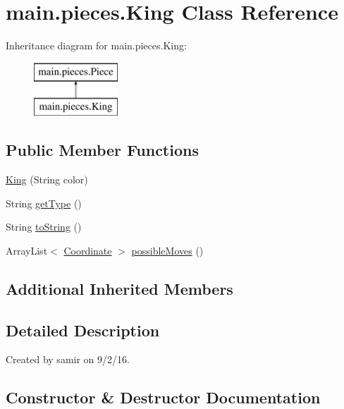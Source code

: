 \hypertarget{classmain_1_1pieces_1_1_king}{}\section{main.\+pieces.\+King Class Reference}
\label{classmain_1_1pieces_1_1_king}
Inheritance diagram for main.\+pieces.\+King\+:\begin{figure}[H]
\begin{center}
\leavevmode
\includegraphics[height=2.000000cm]{classmain_1_1pieces_1_1_king}
\end{center}
\end{figure}
\subsection*{Public Member Functions}
\begin{DoxyCompactItemize}
\item 
\hyperlink{classmain_1_1pieces_1_1_king_aa8a03c9941ca3522dea1a964f1ae15cf}{King} (String color)
\item 
String \hyperlink{classmain_1_1pieces_1_1_king_a357799158a941db860a25da4d0b9ec5a}{get\+Type} ()
\item 
String \hyperlink{classmain_1_1pieces_1_1_king_aa93a1ae4998482975674eeca33112961}{to\+String} ()
\item 
Array\+List$<$ \hyperlink{classmain_1_1model_1_1_coordinate}{Coordinate} $>$ \hyperlink{classmain_1_1pieces_1_1_king_afde71e97df359b784be2db1a66ac36b1}{possible\+Moves} ()
\end{DoxyCompactItemize}
\subsection*{Additional Inherited Members}


\subsection{Detailed Description}
Created by samir on 9/2/16. 

\subsection{Constructor \& Destructor Documentation}
\hypertarget{classmain_1_1pieces_1_1_king_aa8a03c9941ca3522dea1a964f1ae15cf}{}\label{classmain_1_1pieces_1_1_king_aa8a03c9941ca3522dea1a964f1ae15cf} 
